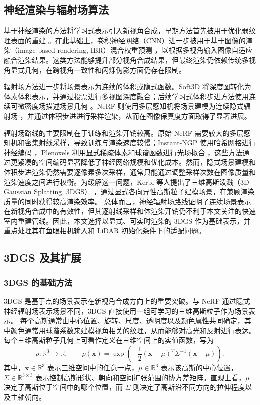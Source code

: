 \subsection{神经渲染与辐射场算法}

基于神经渲染的方法将学习式表示引入新视角合成，早期方法首先被用于优化弱纹理表面的重建 \cite{jancosek2011multi}。在此基础上，卷积神经网络（CNN）进一步被用于基于图像的渲染（image-based rendering, IBR）混合权重预测 \cite{hedman2018deep}，以根据多视角输入图像自适应融合渲染结果。这类方法能够提升部分视角合成结果，但最终渲染仍依赖传统多视角显式几何，在跨视角一致性和闪烁伪影方面仍存在限制。

辐射场方法进一步将场景表示为连续的体积或隐式函数。Soft3D \cite{penner2017soft} 将深度图转化为体素体积表示，并通过投票进行多视图深度融合；后续学习式体积步进方法使用连续可微密度场描述场景几何 \cite{henzler2019escaping}。NeRF 则使用多层感知机将场景建模为连续隐式辐射场 \cite{mildenhall2021nerf}，并通过体积步进进行采样渲染，从而在图像保真度方面取得了显著进展。

辐射场路线的主要限制在于训练和渲染开销较高。原始 NeRF 需要较大的多层感知机和密集射线采样，导致训练与渲染速度较慢；Instant-NGP 使用哈希网格进行神经编码 \cite{muller2022instant}，Plenoxels 利用显式稀疏体素和球谐函数进行光场拟合 \cite{fridovich2022plenoxels}，这些方法通过更紧凑的空间编码显著降低了神经网络规模和优化成本。然而，隐式场景建模和体积步进渲染仍然需要逐像素多次采样，通常只能通过调整采样次数在图像质量和渲染速度之间进行权衡。为缓解这一问题，Kerbl 等人提出了三维高斯泼溅（3D Gaussian Splatting, 3DGS） \cite{kerbl2023}，通过显式各向异性高斯粒子建模场景，在兼顾渲染质量的同时获得较高渲染效率。
总体而言，神经辐射场路线证明了连续场景表示在新视角合成中的有效性，但其逐射线采样和体渲染开销仍不利于本文关注的快速室内重建管线。因此，本文选择以显式、可实时渲染的 3DGS 作为基础表示，并重点处理其在鱼眼相机输入和 LiDAR 初始化条件下的适配问题。

\subsection{3DGS 及其扩展}

\subsubsection{3DGS 的基础方法}

3DGS 是基于点的场景表示在新视角合成方向上的重要突破。与 NeRF 通过隐式神经辐射场表示场景不同，3DGS 直接使用一组可学习的三维高斯粒子作为场景表示。
每个高斯通常由中心位置、旋转、尺度、透明度以及颜色属性共同确定，其中颜色通常用球谐系数来建模视角相关的纹理，从而能够对高光和反射进行表达。每个三维高斯粒子几何上可看作定义在三维空间上的实值函数，写为
\begin{equation}
    \label{equ:3dgs-density}
    \rho : \mathbb{R}^{3} \rightarrow \mathbb{R},
    \qquad
    \rho(\mathbf{x})=\exp\left(-\frac{1}{2}(\mathbf{x}-\mu)^{T}\Sigma^{-1}(\mathbf{x}-\mu)\right).
\end{equation}
其中，\(\mathbf{x}\in\mathbb{R}^{3}\) 表示三维空间中的任意一点，\(\mu\in\mathbb{R}^{3}\) 表示该高斯的中心位置，\(\Sigma\in\mathbb{R}^{3\times 3}\) 表示控制高斯形状、朝向和空间扩张范围的协方差矩阵。直观上看，\(\mu\) 决定了高斯位于空间中的哪个位置，而 \(\Sigma\) 则决定了高斯沿不同方向的拉伸程度以及主轴朝向。

